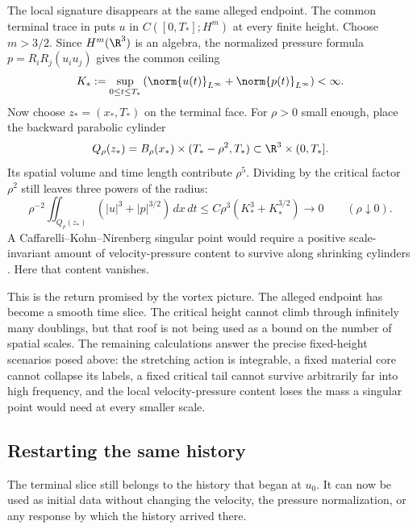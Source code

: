The local signature disappears at the same alleged endpoint.  The common
terminal trace in  puts \(u\) in
\(C([0,T_*];H^m)\) at every finite height.  Choose
\(m>3/2\).  Since \(H^m(\R^3)\) is an algebra, the normalized pressure formula
\(p=R_iR_j(u_i u_j)\) gives the common ceiling
\begin{equation}\label{eq:FiniteIntervalVelocityPressureSupremum}
  K_*
  :=\sup_{0\leq t\leq T_*}
  \left(
    \norm{u(t)}_{L^\infty}
    +\norm{p(t)}_{L^\infty}
  \right)
  <\infty.
\end{equation}
Now choose \(z_*=(x_*,T_*)\) on the terminal face.  For \(\rho>0\) small
enough, place the backward parabolic cylinder
\[
  Q_\rho(z_*)
  =B_\rho(x_*)\times(T_*-\rho^2,T_*)
  \subset\R^3\times(0,T_*].
\]
Its spatial volume and time length contribute \(\rho^5\).  Dividing by the
critical factor \(\rho^2\) still leaves three powers of the radius:
\begin{equation}\label{eq:VanishingLocalScaleInvariantContent}
  \rho^{-2}
  \iint_{Q_\rho(z_*)}
  \left(|u|^3+|p|^{3/2}\right)\,dx\,dt
  \leq
  C\rho^3\left(K_*^3+K_*^{3/2}\right)
  \longrightarrow0
  \qquad(\rho\downarrow0).
\end{equation}
A Caffarelli--Kohn--Nirenberg singular point would require a positive
scale-invariant amount of velocity-pressure content to survive along shrinking
cylinders \parencite{CaffarelliKohnNirenberg1982}.  Here that content vanishes.

This is the return promised by the vortex picture.  The alleged endpoint has
become a smooth time slice.  The critical height cannot climb through
infinitely many doublings, but that roof is not being used as a bound on the
number of spatial scales.  The remaining calculations answer the precise
fixed-height scenarios posed above: the stretching action is integrable, a
fixed material core cannot collapse its labels, a fixed critical tail cannot
survive arbitrarily far into high frequency, and the local velocity-pressure
content loses the mass a singular point would need at every smaller scale.

\subsection{Restarting the same history}\label{sub:ConditionalGlobalRestart}

The terminal slice still belongs to the history that began at \(u_0\).  It can
now be used as initial data without changing the velocity, the pressure
normalization, or any response by which the history arrived there.

